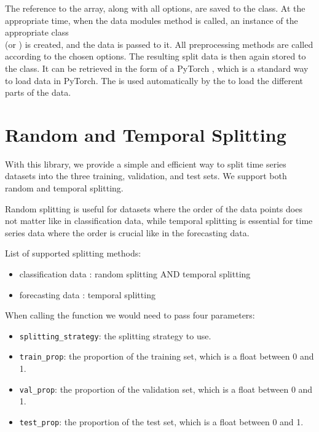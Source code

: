 \documentclass[review]{AIM_report}
\begin{document}
The reference to the \numpy array, along with all options, are saved to the class. At the appropriate time, when the data modules \setup method is called, an instance of the appropriate class\\
(\forecastingDataSet or \classificationDataSet) is created, and the data is passed to it. All preprocessing methods are called according to the chosen options. The resulting split data is then again stored to the \rustDM class. It can be retrieved in the form of a PyTorch \dataLoader, which is a standard way to load data in PyTorch. The \dataLoader is used automatically by the \lightningModule to load the different parts of the data.

\newpage
\section{Random and Temporal Splitting}
With this library, we provide a simple and efficient way to split time series datasets into the three training, validation, and test sets. We support both random and temporal splitting. 

Random splitting is useful for datasets where the order of the data points does not matter like in classification data, while temporal splitting is essential for time series data where the order is crucial like in the forecasting data.

List of supported splitting methods:
\begin{itemize}
    \item classification data : random splitting AND temporal splitting
    \item forecasting data : temporal splitting
\end{itemize}

When calling the function \splitShort we would need to pass four parameters:
\begin{itemize}
    \item \verb|splitting_strategy|: the splitting strategy to use.
    \item \verb|train_prop|: the proportion of the training set, which is a float between 0 and 1.
    \item \verb|val_prop|: the proportion of the validation set, which is a float between 0 and 1.
    \item \verb|test_prop|: the proportion of the test set, which is a float between 0 and 1.
\end{itemize}
\end{document}
